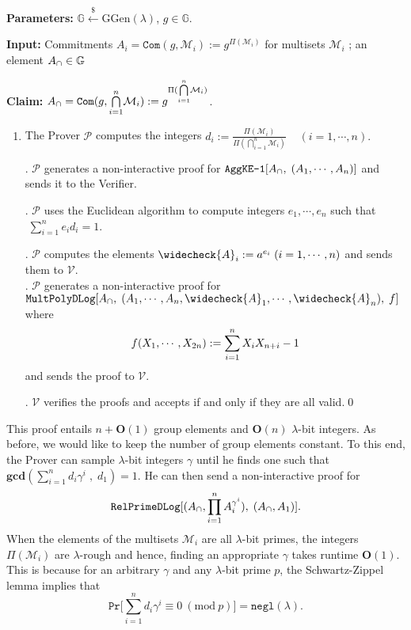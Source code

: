 \documentclass[11pt, lettersize, notitlepage, leqno, footskip=0.6cm]{article}
\newcommand{\pl}{\prod\limits}
\newcommand{\slim}{\sum\limits}
\newcommand{\ttt}{\texttt}
\newcommand{\negl}{\ttt{{negl}}}
\newcommand{\mc}{\mathcal}
\newcommand{\mb}{\mathbb}
\newcommand{\mbf}{\mathbf}
\newcommand{\mr}{\mathrm}
\newcommand{\lam}{\lambda}
\newcommand{\lamb}{\lambda}
\newcommand{\weck}{\widecheck}
\newcommand{\bO}{\mbf{O}}
\newcommand{\mP}{\mc{P}}
\newcommand{\V}{\mc{V}}
\newcommand{\mcM}{\mc{M}}
\newcommand{\vs}{\vspace{-0.15cm}}
\newcommand{\noin}{\noindent}
\newcommand{\Mod}[1]{\ (\mathrm{mod}\ #1)}
\newcommand{\GCD}{\mbf{gcd}}
\numberwithin{equation}{section}
\begin{document}
\noin \textbf{Parameters:} $\mb{G}\xleftarrow{\$} \mr{GGen}(\lamb)$,\; $g\in \mb{G}$.

\noin \textbf{Input:} Commitments $A_i = \ttt{Com}(g, \mcM_i) := g^{\Pi(\mc{M}_i)}$ for multisets $\mc{M}_i$ ; an element $A_{\tt{\cap}}\in\mb{G}$

\noin \textbf{Claim:} $A_{\tt{\cap}} = \protect{\verb|Com|}(g, {\bigcap\limits_{i=1}^n} \mc{M}_i) := g^{\Pi({\bigcap\limits_{i=1}^n} \mc{M}_i)}$.

\begin{enumerate}[wide, labelwidth=!, labelindent=0pt]\vs \item The Prover $\mP$ computes the integers $d_i:= \frac{\Pi(\mc{M}_i)}{\Pi({\bigcap\limits_{i=1}^n} \mc{M}_i)}\;\;\;\; (i=1,\cdots,n).$

\noin 2. $\mP$ generates a non-interactive proof for $\ttt{AggKE-1}[A_{\tt{\cap}},\;(A_1,\cdots,A_n)]$ and sends it to the Verifier.

\noin 3. $\mP$ uses the Euclidean algorithm to compute integers $e_1,\cdots,e_n$ such that $\;\sum_{i=1}^n e_id_i = 1$.

\noin 4. $\mP$ computes the elements $\weck{A}_i := a^{e_i}\; (i=1,\cdots,n)$ and sends them to $\V$.\\
\noin 5. $\mP$ generates a non-interactive proof for $\ttt{MultPolyDLog}[A_{\tt{\cap}},\; (A_1,\cdots,A_n, \weck{A}_1,\cdots,\weck{A}_n),\;f]$ where \vs $$f(X_1,\cdots,X_{2n}):= \slim_{i=1}^n X_iX_{n+i} - 1 \vs $$ and sends the proof to $\V$.

\noin 6. $\V$ verifies the proofs and accepts if and only if they are all valid.\qed \end{enumerate}

This proof entails $n+\bO(1)$ group elements and $\bO(n)$ $\lam$-bit integers. As before, we would like to keep the number of group elements constant. To this end, the Prover can sample $\lam$-bit integers $\gamma$ until he finds one such that $\GCD(\sum_{i=1}^n d_i\gamma^i\;,\; d_1) = 1 .$ He can then send a non-interactive proof for \vs $$\ttt{RelPrimeDLog}[(A_{\tt{\cap}},\pl_{i=1}^n A_i^{\gamma^i}),\;(A_{\tt{\cap}}, A_1)].$$ When the elements of the multisets $\mc{M}_i$ are all $\lam$-bit primes, the integers $\Pi(\mcM_i)$ are $\lam$-rough and hence, finding an appropriate $\gamma$ takes runtime $\bO(1)$. This is because for an arbitrary $\gamma$ and any $\lam$-bit prime $p$, the Schwartz-Zippel lemma implies that \vs $$\ttt{Pr}\Big[\slim_{i=1}^n d_i\gamma^i \equiv 0\Mod{p} \Big] = \negl(\lam). $$ 
\end{document}
